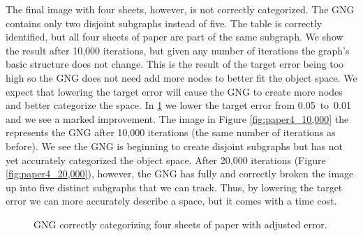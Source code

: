 \documentclass{article}
\renewcommand{\|}{\origbar} %
\begin{document}
The final image with four sheets, however, is not correctly categorized. The GNG contains only two disjoint subgraphs instead of five. The table is correctly identified, but all four sheets of paper are part of the same subgraph. We show the result after 10,000 iterations, but given any number of iterations the graph's basic structure does not change. This is the result of the target error being too high so the GNG does not need add more nodes to better fit the object space. We expect that lowering the target error will cause the GNG to create more nodes and better categorize the space. In \ref{fig:paper4Lowerror} we lower the target error from 0.05~to~0.01 and we see a marked improvement. The image in Figure \ref{fig:paper4_10,000} the represents the GNG after 10,000 iterations (the same number of iterations as before). We see the GNG is beginning to create disjoint subgraphs but has not yet accurately categorized the object space. After 20,000 iterations (Figure \ref{fig:paper4_20,000}), however, the GNG has fully and correctly broken the image up into five distinct subgraphs that we can track. Thus, by lowering the target error we can more accurately describe a space, but it comes with a time cost. 

\begin{figure}[h!]
  \centering

  \caption{GNG correctly categorizing four sheets of paper with adjusted error.}
  \label{fig:paper4Lowerror}
\end{figure}
\end{document}
